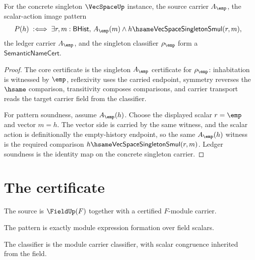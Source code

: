 \begin{theorem}
\label{thm:vecspace-singleton-smul-image-semantic-name-cert}
For the concrete singleton $\VecSpaceUp$ instance, the source carrier
$A_{\emp}$, the scalar-action image pattern
$$
P(h)\;:\Longleftrightarrow\;\exists r,m:\mathsf{BHist},\,
  A_{\emp}(m)\wedge h\hsame\mathsf{VecSpaceSingletonSmul}(r,m),
$$
the ledger carrier $A_{\emp}$, and the singleton classifier $\rho_{\emp}$
form a $\mathsf{SemanticNameCert}$.
\end{theorem}
\begin{proof}
The core certificate is the singleton $A_{\emp}$ certificate for $\rho_{\emp}$:
inhabitation is witnessed by $\emp$, reflexivity uses the carried endpoint,
symmetry reverses the $\hsame$ comparison, transitivity composes comparisons,
and carrier transport reads the target carrier field from the classifier.

For pattern soundness, assume $A_{\emp}(h)$. Choose the displayed scalar
$r=\emp$ and vector $m=h$. The vector side is carried by the same witness, and
the scalar action is definitionally the empty-history endpoint, so the same
$A_{\emp}(h)$ witness is the required comparison
$h\hsame\mathsf{VecSpaceSingletonSmul}(r,m)$. Ledger soundness is the identity
map on the concrete singleton carrier.
\end{proof}

\section{The certificate}

\begin{definition}
\label{def:vecspace-source-specification}
The source is \(\FieldUp(F)\) together with a certified \(F\)-module carrier.
\end{definition}

\begin{definition}
\label{def:vecspace-pattern-specification}
The pattern is exactly module expression formation over field scalars.
\end{definition}

\begin{definition}
\label{def:vecspace-classifier-specification}
The classifier is the module carrier classifier, with scalar congruence inherited from the field.
\end{definition}

